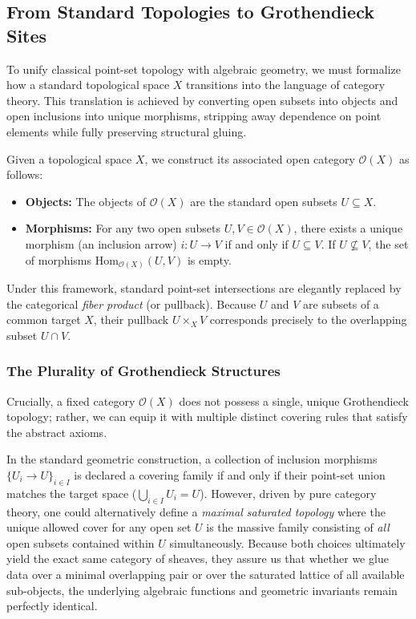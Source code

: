 \documentclass[11pt,oneside]{article}
\begin{document}
\subsection{From Standard Topologies to Grothendieck Sites}
To unify classical point-set topology with algebraic geometry, we must formalize how a standard topological space $X$ transitions into the language of category theory. This translation is achieved by converting open subsets into objects and open inclusions into unique morphisms, stripping away dependence on point elements while fully preserving structural gluing.

Given a topological space $X$, we construct its associated open category $\mathcal{O}(X)$ as follows:
\begin{itemize}
    \item \textbf{Objects:} The objects of $\mathcal{O}(X)$ are the standard open subsets $U \subseteq X$.
    \item \textbf{Morphisms:} For any two open subsets $U, V \in \mathcal{O}(X)$, there exists a unique morphism (an inclusion arrow) $i: U \to V$ if and only if $U \subseteq V$. If $U \not\subseteq V$, the set of morphisms $\text{Hom}_{\mathcal{O}(X)}(U,V)$ is empty.
\end{itemize}

Under this framework, standard point-set intersections are elegantly replaced by the categorical \emph{fiber product} (or pullback). Because $U$ and $V$ are subsets of a common target $X$, their pullback $U \times_X V$ corresponds precisely to the overlapping subset $U \cap V$.

\subsubsection{The Plurality of Grothendieck Structures}
Crucially, a fixed category $\mathcal{O}(X)$ does not possess a single, unique Grothendieck topology; rather, we can equip it with multiple distinct covering rules that satisfy the abstract axioms. 

In the standard geometric construction, a collection of inclusion morphisms $\{U_i \to U\}_{i \in I}$ is declared a covering family if and only if their point-set union matches the target space ($\bigcup_{i \in I} U_i = U$). However, driven by pure category theory, one could alternatively define a \emph{maximal saturated topology} where the unique allowed cover for any open set $U$ is the massive family consisting of \emph{all} open subsets contained within $U$ simultaneously. Because both choices ultimately yield the exact same category of sheaves, they assure us that whether we glue data over a minimal overlapping pair or over the saturated lattice of all available sub-objects, the underlying algebraic functions and geometric invariants remain perfectly identical.
\end{document}
